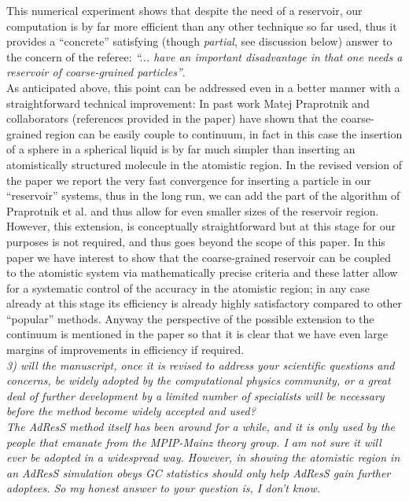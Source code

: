 \documentclass[12pt,a4paper]{article}
\begin{document}
This numerical experiment shows that despite the need of a reservoir, our computation is by far more efficient than any other technique so far used, thus it provides a ``concrete'' satisfying (though {\it partial}, see discussion below) answer to the concern of the referee: {\it ``... have an important disadvantage in that one needs a reservoir of coarse-grained particles''}.\\
As anticipated above, this point can be addressed even in a better manner with a straightforward technical improvement:
In past work Matej Praprotnik and collaborators (references provided in the paper) have shown that the coarse-grained region can be easily couple to continuum, in fact in this case the insertion of a sphere in a spherical liquid is by far much simpler than inserting an atomistically structured molecule in the atomistic region. In the revised version of the paper we report the very fast convergence for inserting a particle in our ``reservoir'' systems, thus in the long run, we can add the part of the algorithm of Praprotnik et al. and thus allow for even smaller sizes of the reservoir region. However, this extension, is conceptually straightforward but at this stage for our purposes is not required, and thus goes beyond the scope of this paper. In this paper we have interest to show that the coarse-grained reservoir can be coupled to the atomistic system via mathematically precise criteria and these latter allow for a systematic control of the accuracy in the atomistic region; in any case already at this stage its efficiency is already highly satisfactory compared to other ``popular'' methods. Anyway the perspective of the possible extension to the continuum is mentioned in the paper so that it is clear that we have even large margins of improvements in efficiency if required.\\

{\color{teal} {\it 3) will the manuscript, once it is revised to address your scientific
questions and concerns, be widely adopted by the computational physics 
community, or a great deal of further development by a limited number
of specialists will be necessary before the method become widely
accepted and used?\\


The AdResS method itself has been around for a while, and it is only
used by the people that emanate from the MPIP-Mainz theory group. I am
not sure it will ever be adopted in a widespread way. However, in
showing the atomistic region in an AdResS simulation obeys GC
statistics should only help AdResS gain further adoptees. So my honest
answer to your question is, I don't know.}}\\
\end{document}

